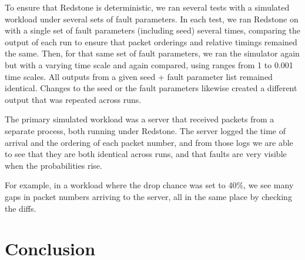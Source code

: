 {\fontsize{12}{15}\selectfont 

To ensure that Redstone is deterministic, we ran several tests with a simulated workload under several sets of fault parameters. In each test, we ran Redstone
on with a single set of fault parameters (including seed) several times, comparing the output of each run to ensure that packet orderings and relative timings remained the same. Then, for that same set of fault parameters, we ran the simulator again but with a varying time scale and again compared, using ranges from 1 to 0.001 time scales. All outputs from a given seed + fault parameter list remained identical. Changes to the seed or the fault parameters likewise created a different output that was repeated across runs.

The primary simulated workload was a server that received packets from a separate process, both running under Redstone. The server logged the time of arrival and the ordering of each packet number, and from those logs we are able to see that they are both identical across runs, and that faults are very visible when the probabilities rise.

For example, in a workload where the drop chance was set to 40$\%$, we see many gaps in packet numbers arriving to the server, all in the same place by checking the diffs.

}

\section{\txtrsdust Conclusion}

{\fontsize{12}{15}\selectfont 

}

% 

